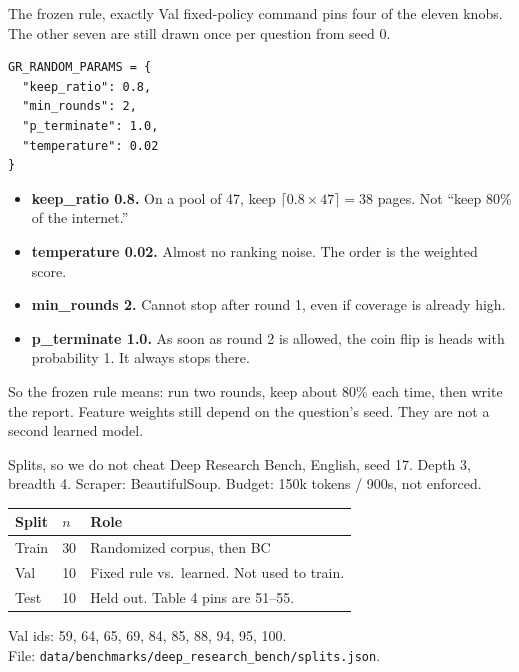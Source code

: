 \documentclass[aspectratio=169,11pt]{beamer}
\begin{document}
\begin{frame}[fragile]{The frozen rule, exactly}
  Val fixed-policy command pins four of the eleven knobs. The other seven are still drawn once per question from seed 0.
  \vspace{0.2em}
  \begin{verbatim}
GR_RANDOM_PARAMS = {
  "keep_ratio": 0.8,
  "min_rounds": 2,
  "p_terminate": 1.0,
  "temperature": 0.02
}
  \end{verbatim}
  \vspace{0.15em}
  \begin{itemize}
    \item \textbf{keep\_ratio 0.8.} On a pool of 47, keep $\lceil 0.8 \times 47 \rceil = 38$ pages. Not ``keep 80\% of the internet.''
    \item \textbf{temperature 0.02.} Almost no ranking noise. The order is the weighted score.
    \item \textbf{min\_rounds 2.} Cannot stop after round 1, even if coverage is already high.
    \item \textbf{p\_terminate 1.0.} As soon as round 2 is allowed, the coin flip is heads with probability 1. It always stops there.
  \end{itemize}
  So the frozen rule means: run two rounds, keep about 80\% each time, then write the report. Feature weights still depend on the question's seed. They are not a second learned model.
\end{frame}

\begin{frame}{Splits, so we do not cheat}
  Deep Research Bench, English, seed 17. Depth 3, breadth 4. Scraper: BeautifulSoup. Budget: 150k tokens / 900s, not enforced.
  \vspace{0.4em}
  \begin{tabular}{lll}
    \hline
    Split & $n$ & Role \\
    \hline
    Train & 30 & Randomized corpus, then BC \\
    Val & 10 & Fixed rule vs.\ learned. Not used to train. \\
    Test & 10 & Held out. Table 4 pins are 51--55. \\
    \hline
  \end{tabular}
  \vspace{0.6em}
  Val ids: 59, 64, 65, 69, 84, 85, 88, 94, 95, 100.\\
  {\small File: \texttt{data/benchmarks/deep\_research\_bench/splits.json}.}
\end{frame}
\end{document}

